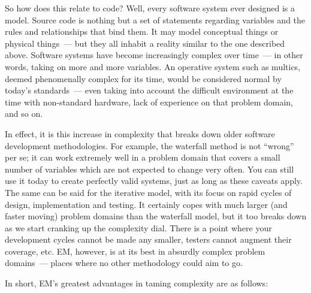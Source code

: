 \documentclass{memoir}
\begin{document}
So how does this relate to code? Well, every software system ever
designed is a model. Source code is nothing but a set of statements
regarding variables and the rules and relationships that bind them. It
may model conceptual things or physical things~--- but they all
inhabit a reality similar to the one described above. Software systems
have become increasingly complex over time~--- in other words, taking
on more and more variables. An operative system such as multics,
deemed phenomenally complex for its time, would be considered normal
by today's standards~--- even taking into account the difficult
environment at the time with non-standard hardware, lack of experience
on that problem domain, and so on.

In effect, it is this increase in complexity that breaks down older
software development methodologies. For example, the waterfall method
is not ``wrong'' per se; it can work extremely well in a problem
domain that covers a small number of variables which are not expected
to change very often. You can still use it today to create perfectly
valid systems, just as long as these caveats apply. The same can be
said for the iterative model, with its focus on rapid cycles of
design, implementation and testing. It certainly copes with much
larger (and faster moving) problem domains than the waterfall model,
but it too breaks down as we start cranking up the complexity
dial. There is a point where your development cycles cannot be made
any smaller, testers cannot augment their coverage, etc. EM, however,
is at its best in absurdly complex problem domains~--- places where
no other methodology could aim to go.

In short, EM's greatest advantages in taming complexity are as
follows:
\end{document}
